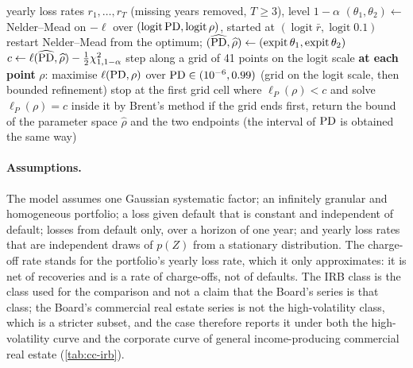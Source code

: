 \begin{algorithm}[htbp]
\caption{Maximum-likelihood fit of $(\PD,\rho)$ with the profile-likelihood interval of the asset correlation.}
\label{alg:cc-profile}
\begin{algorithmic}[1]
\Require yearly loss rates $r_1,\dots,r_T$ (missing years removed, $T\ge3$), level $1-\alpha$
\State $(\theta_1,\theta_2)\gets$ Nelder--Mead on $-\ell$ over $(\operatorname{logit}\mathrm{PD},\operatorname{logit}\rho)$, started at $(\operatorname{logit}\bar r,\operatorname{logit}0.1)$
\State restart Nelder--Mead from the optimum; $(\widehat{\mathrm{PD}},\widehat\rho)\gets(\operatorname{expit}\theta_1,\operatorname{expit}\theta_2)$
\State $c\gets\ell(\widehat{\mathrm{PD}},\widehat\rho)-\tfrac12\chi^2_{1,1-\alpha}$
\State step along a grid of 41 points on the logit scale
\State \textbf{at each point} $\rho$: maximise $\ell(\mathrm{PD},\rho)$ over $\mathrm{PD}\in(10^{-6},0.99)$ (grid on the logit scale, then bounded refinement)
\State stop at the first grid cell where $\ell_P(\rho)<c$ and solve $\ell_P(\rho)=c$ inside it by Brent's method
\State if the grid ends first, return the bound of the parameter space
\EndFor
\State \Return $\widehat\rho$ and the two endpoints (the interval of $\mathrm{PD}$ is obtained the same way)
\end{algorithmic}
\end{algorithm}

\paragraph{Assumptions.} The model assumes one Gaussian systematic factor; an infinitely granular and homogeneous portfolio; a loss given
default that is constant and independent of default; losses from default only, over a horizon of one year; and yearly loss rates that are
independent draws of $p(Z)$ from a stationary distribution. The charge-off rate stands for the portfolio's yearly loss rate, which it
only approximates: it is net of recoveries and is a rate of charge-offs, not of defaults. The IRB class is the class used for the comparison and not a claim that the Board's series is that class; the Board's commercial real estate series is not the
high-volatility class, which is a stricter subset, and the case therefore reports it under both the high-volatility curve and the corporate curve of general
income-producing commercial real estate (\cref{tab:cc-irb}).

